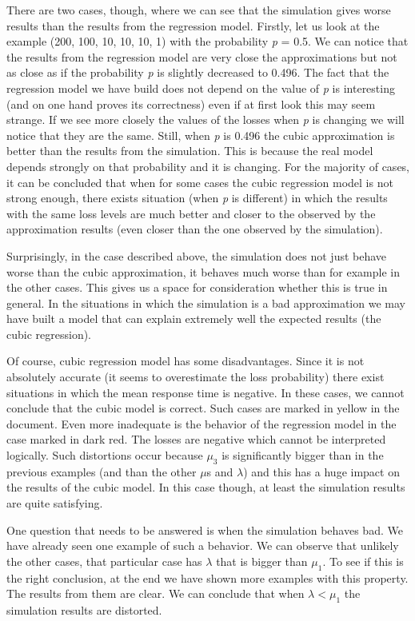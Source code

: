 \documentclass[12pt]{article}
\theoremstyle{plain}
\begin{document}
There are two cases, though, where we can see that the simulation gives worse
results than the results from the regression model. Firstly, let us look at the
example (200, 100, 10, 10, 10, 1) with the probability \emph{p} = 0.5. We can notice
that the results from the regression model are very close the approximations but not as
close as if the probability \emph{p} is slightly decreased to 0.496. The fact
that the regression model we have build does not depend on the value of
\emph{p} is interesting (and on one hand proves its correctness) even if at
first look this may seem strange. If we see more closely the values of the
losses when \emph{p} is changing we will notice that they are the
same. Still, when \emph{p} is 0.496 the cubic approximation is better than the
results from the simulation.  This is because the real model depends strongly
on that probability and it is changing. For the majority of cases, it can be
concluded that when for some cases the cubic regression model is not strong
enough, there exists situation (when \emph{p} is different) in which the results
with the same loss levels are much better and closer to the observed by the approximation results
(even closer than the one observed by the simulation).

Surprisingly, in the case described above, the simulation does not just behave
worse than the cubic approximation, it behaves much worse than for example in
the other cases. This gives us a space for consideration whether this is true in
general. In the situations in which the simulation is a bad approximation we
may have built a model that can explain extremely well the expected results (the cubic regression).

Of course, cubic regression model has some disadvantages. Since it is not
absolutely accurate (it seems to overestimate the loss probability) there exist
situations in which the mean response time is negative. In these cases, we
cannot conclude that the cubic model is correct. Such cases are marked in
yellow in the document. Even more inadequate is the behavior of the regression
model in the case marked in dark red. The losses are negative which
cannot be interpreted logically.  Such distortions occur because $\mu_3$ is
significantly bigger than in the previous examples (and than the other $\mu$s
and $\lambda$) and this has a huge impact on the results of the cubic model. In
this case though, at least the simulation results are quite satisfying.

One question that needs to be answered is when the simulation behaves bad.
We have already seen one example of such a behavior. We can observe that
unlikely the other cases, that particular case has $\lambda$ that is bigger than
$\mu_1$. To see if this is the right conclusion, at the end we have shown more
examples with this property. The results from them are clear. We can conclude
that when $\lambda < \mu_1$ the simulation results are distorted.
\end{document}
